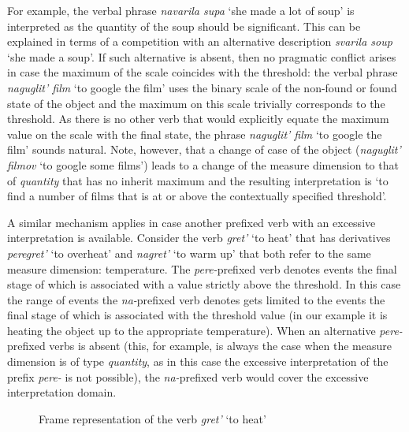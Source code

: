 For example, the verbal phrase \textit{navarila supa} `she made a lot of soup' is interpreted as the quantity of the soup should be significant. This can be explained in terms of a competition with an alternative description \textit{svarila soup} `she made a soup'. If such alternative is absent, then no pragmatic conflict arises in case the maximum of the scale coincides with the threshold: the verbal phrase \textit{naguglit' film} `to google the film' uses the binary scale of the non-found or found state of the object and the maximum on this scale trivially corresponds to the threshold. As there is no other verb that would explicitly equate the maximum value on the scale with the final state, the phrase \textit{naguglit' film} `to google the film' sounds natural. Note, however, that a change of case of the object (\textit{naguglit' filmov} `to google some films') leads to a change of the measure dimension to that of \textit{quantity} that has no inherit maximum and the resulting interpretation is `to find a number of films that is at or above the contextually specified threshold'.

A similar mechanism applies in case another prefixed verb with an excessive interpretation is available. Consider the verb \textit{gret'} `to heat' that has derivatives \textit{peregret'} `to overheat' and \textit{nagret'} `to warm up' that both refer to the same measure dimension: temperature. The \textit{pere-}prefixed verb denotes events the final stage of which is associated with a value strictly above the threshold. In this case the range of events the \textit{na-}prefixed verb denotes gets limited to the events the final stage of which is associated with the threshold value (in our example it is heating the object up to the appropriate temperature). When an alternative \textit{pere-}prefixed verbs is absent (this, for example, is always the case when the measure dimension is of type \textit{quantity}, as in this case the excessive interpretation of the prefix \textit{pere-} is not possible), the \textit{na-}prefixed verb would cover the excessive interpretation domain. 

\begin{figure}
\centering
{}
\caption{Frame representation of the verb \textit{gret'} `to heat' \label{frame:heat}}
\end{figure}

